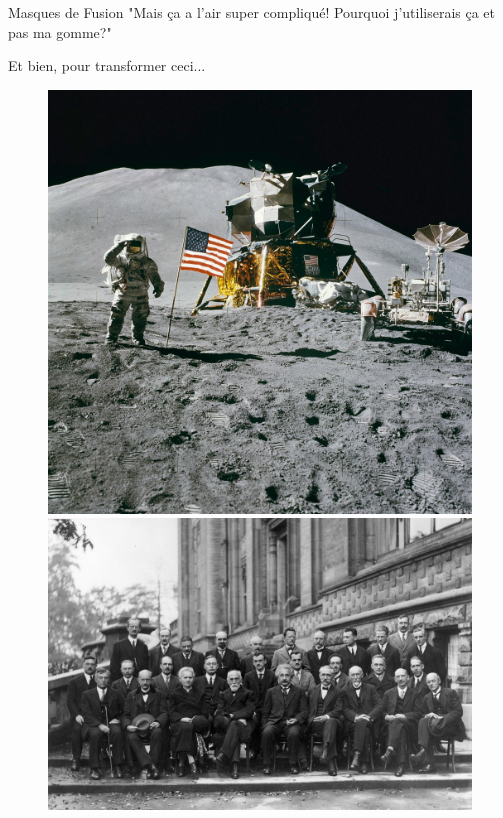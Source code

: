 	\begin{frame}{Masques de Fusion}
		"Mais ça a l'air super compliqué! Pourquoi j'utiliserais ça et pas ma gomme?"

		Et bien, pour transformer ceci...

		\begin{figure}[H]
			\centering
			\begin{minipage}{.5\textwidth}
				\centering
				\includegraphics[width=.9\textwidth]{Images/purge/Apollo_15_flag,_rover,_LM,_Irwin}
			\end{minipage}%
			\begin{minipage}{.5\textwidth}
				\centering
				\includegraphics[width=.9\textwidth]{Images/mask/Conference_Solvay_Original}
			\end{minipage}
		\end{figure}


	\end{frame}

